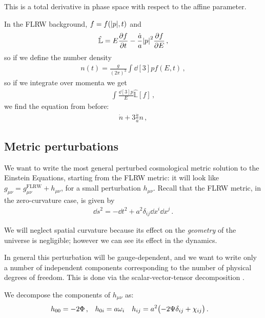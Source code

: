 \documentclass[main.tex]{subfiles}
\begin{document}
This is a total derivative in phase space with respect to the affine parameter. 

In the FLRW background, \(f = f(\abs{p}, t)\) and 
%
\begin{align}
\hat{\mathbb{L}} = E \pdv{f}{t} - \frac{\dot{a}}{a} \abs{p}^2 \pdv{f}{E}
\,,
\end{align}
%
so if we define the number density 
%
\begin{align}
n(t) = \frac{g}{(2\pi )^3} \int \dd[3]{p} f(E, t)
\,,
\end{align}
%
so if we integrate over momenta we get 
%
\begin{align}
\int \frac{ \dd[3]{p}}{E} \hat{\mathbb{L}}[f] 
\,,
\end{align}
%
we find the equation from before: 
%
\begin{align}
\dot{n} + 3 \frac{\dot{a}}{a} n 
\,,
\end{align}
%

\subsection{Metric perturbations}

We want to write the most general perturbed cosmological metric solution to the Einstein Equations, starting from the FLRW metric: it will look like \(g_{\mu \nu } = g_{\mu \nu }^{\text{FLRW}} + h_{\mu \nu }\), for a small perturbation \(h_{\mu \nu }\).
Recall that the FLRW metric, in the zero-curvature case, is given by 
%
\begin{align}
\dd{s^2} =  - \dd{t^2} + a^2 \delta_{ij} \dd{x^{i}} \dd{x^{j}}
\,.
\end{align}
%

We will neglect spatial curvature because its effect on the \emph{geometry} of the universe is negligible; however we can see its effect in the dynamics.

In general this perturbation will be gauge-dependent, and we want to write only a number of independent components corresponding to the number of physical degrees of freedom. This is done via the scalar-vector-tensor decomposition \cite[section 2.1]{bertschingerCosmologicalPerturbationTheory2000a}.

We decompose the components of \(h_{\mu \nu }\) as: 
%
\begin{align}
h_{00} &= -2 \Phi \,, &
h_{0i} &= a \omega_{i} &
h_{ij} &= a^2 \qty(-2 \Psi \delta_{ij} + \chi_{ij})
\,.
\end{align}
\end{document}
